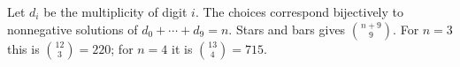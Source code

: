 Let $d_i$ be the multiplicity of digit $i$. The choices correspond bijectively to nonnegative solutions of $d_0+\cdots+d_9=n$. Stars and bars gives $\boxed{\binom{n+9}{9}}$. For $n=3$ this is $\binom{12}{3}=220$; for $n=4$ it is $\binom{13}{4}=715$.
